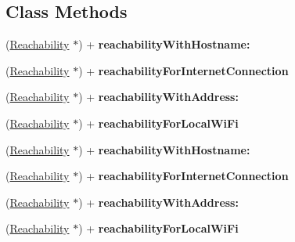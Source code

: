 \subsection*{Class Methods}
\begin{DoxyCompactItemize}
\item 
\mbox{\label{interface_reachability_a2f1b1e51498d1458918ac7399330b3e5}} 
(\mbox{\hyperlink{interface_reachability}{Reachability}} $\ast$) + {\bfseries reachability\+With\+Hostname\+:}
\item 
\mbox{\label{interface_reachability_ad2962f5292dee6a56f43175d344c3da1}} 
(\mbox{\hyperlink{interface_reachability}{Reachability}} $\ast$) + {\bfseries reachability\+For\+Internet\+Connection}
\item 
\mbox{\label{interface_reachability_add9b3533dfed13fc2215cc27bca74ace}} 
(\mbox{\hyperlink{interface_reachability}{Reachability}} $\ast$) + {\bfseries reachability\+With\+Address\+:}
\item 
\mbox{\label{interface_reachability_afef931b75654390d24d9c897835929f5}} 
(\mbox{\hyperlink{interface_reachability}{Reachability}} $\ast$) + {\bfseries reachability\+For\+Local\+Wi\+Fi}
\item 
\mbox{\label{interface_reachability_a28cf8da75a1ea6e2b7bb37a1059bd4bd}} 
(\mbox{\hyperlink{interface_reachability}{Reachability}} $\ast$) + {\bfseries reachability\+With\+Hostname\+:}
\item 
\mbox{\label{interface_reachability_a0ee51a19a66b82725775d6cb4e88b0c2}} 
(\mbox{\hyperlink{interface_reachability}{Reachability}} $\ast$) + {\bfseries reachability\+For\+Internet\+Connection}
\item 
\mbox{\label{interface_reachability_a6707d0d4497e00cfaade2127f1c2504b}} 
(\mbox{\hyperlink{interface_reachability}{Reachability}} $\ast$) + {\bfseries reachability\+With\+Address\+:}
\item 
\mbox{\label{interface_reachability_a91b75dbb4e925d230210d6854fefbe25}} 
(\mbox{\hyperlink{interface_reachability}{Reachability}} $\ast$) + {\bfseries reachability\+For\+Local\+Wi\+Fi}

\end{DoxyCompactItemize}
